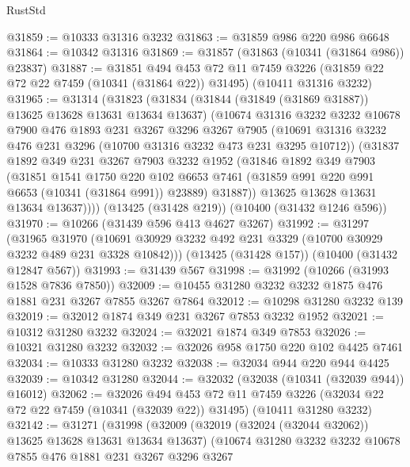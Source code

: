 \begin{lexlean}{RustStd}
\begin{coremodule}
{\begin{coremodule}
{{{{{{{{{{{{{{{{{{{{{{{{{@31859 := @10333 @31316 @3232
@31863 := @31859 @986 @220 @986 @6648
@31864 := @10342 @31316
@31869 := @31857 (@31863 (@10341 (@31864 @986)) @23837)
@31887 := @31851
    @494
    @453
    @72
    @11
    @7459
    @3226
    (@31859 @22 @72 @22 @7459 (@10341 (@31864 @22)) @31495)
    (@10411 @31316 @3232)
@31965 := @31314
    (@31823
      (@31834
        (@31844 (@31849 (@31869 @31887)) @13625 @13628 @13631 @13634 @13637)
        (@10674
          @31316
          @3232
          @3232
          @10678
          @7900
          @476
          @1893
          @231
          @3267
          @3296
          @3267
          @7905
          (@10691 @31316 @3232 @476 @231 @3296 (@10700 @31316 @3232 @473 @231 @3295 @10712))
          (@31837
            @1892
            @349
            @231
            @3267
            @7903
            @3232
            @1952
            (@31846
              @1892
              @349
              @7903
              (@31851
                @1541
                @1750
                @220
                @102
                @6653
                @7461
                (@31859 @991 @220 @991 @6653 (@10341 (@31864 @991)) @23889)
                @31887))
            @13625
            @13628
            @13631
            @13634
            @13637))))
    (@13425 (@31428 @219))
    (@10400 (@31432 @1246 @596))
@31970 := @10266 (@31439 @596 @413 @4627 @3267)
@31992 := @31297
    (@31965
      @31970
      (@10691 @30929 @3232 @492 @231 @3329 (@10700 @30929 @3232 @489 @231 @3328 @10842)))
    (@13425 (@31428 @157))
    (@10400 (@31432 @12847 @567))
@31993 := @31439 @567
@31998 := @31992 (@10266 (@31993 @1528 @7836 @7850))
@32009 := @10455 @31280 @3232 @3232 @1875 @476 @1881 @231 @3267 @7855 @3267 @7864
@32012 := @10298 @31280 @3232 @139
@32019 := @32012 @1874 @349 @231 @3267 @7853 @3232 @1952
@32021 := @10312 @31280 @3232
@32024 := @32021 @1874 @349 @7853
@32026 := @10321 @31280 @3232
@32032 := @32026 @958 @1750 @220 @102 @4425 @7461
@32034 := @10333 @31280 @3232
@32038 := @32034 @944 @220 @944 @4425
@32039 := @10342 @31280
@32044 := @32032 (@32038 (@10341 (@32039 @944)) @16012)
@32062 := @32026
    @494
    @453
    @72
    @11
    @7459
    @3226
    (@32034 @22 @72 @22 @7459 (@10341 (@32039 @22)) @31495)
    (@10411 @31280 @3232)
@32142 := @31271
    (@31998
      (@32009
        (@32019 (@32024 (@32044 @32062)) @13625 @13628 @13631 @13634 @13637)
        (@10674
          @31280
          @3232
          @3232
          @10678
          @7855
          @476
          @1881
          @231
          @3267
          @3296
          @3267
}}}}}}}}}}}}}}}}}}}}}}}}}
\end{coremodule}}
\end{coremodule}
\end{lexlean}
